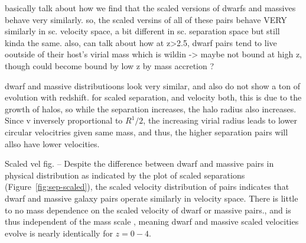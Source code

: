 \documentclass[twocolumn]{aastex631}
\begin{document}
basically talk about how we find that the scaled versions of dwarfs and massives behave very similarly.
so, the scaled versins of all of these pairs behave VERY similarly in sc. velocity space, a bit different in sc. separation space but still kinda the same. also, can talk about how at z>2.5, dwarf pairs tend to live ooutside of their host's virial mass which is wildin -> maybe not bound at high z, though could become bound by low z by mass accretion ? 

dwarf and massive distributioons look very similar, and also do not show a ton of evolution with redshift. for scaled separation, and velocity both, this is due to the growth of halos, so while the separation increases, the halo radius also increases. Since v inversely proportional to $R^1/2$, the increasing virial radius leads to lower circular velocitries given same mass, and thus, the higher separation pairs will allso have lower velocities. 

Scaled vel fig. --   Despite the difference between dwarf and massive pairs in physical distribution as indicated by the plot of scaled separations (Figure~\ref{fig:sep-scaled}), the scaled velocity distribution of pairs indicates that dwarf and massive galaxy pairs operate similarly in velocity space. There is little to no mass dependence on the scaled velocity of dwarf or massive pairs., and is thus independent of the mass scale , meaning dwarf and massive scaled velocities evolve is nearly identically for $z=0-4$.
\end{document}
